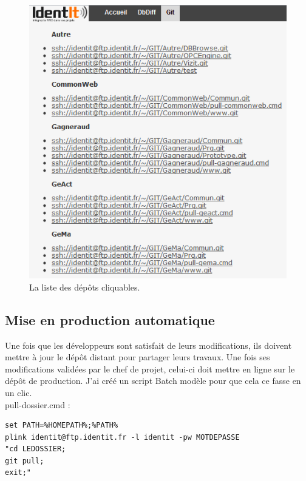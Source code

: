\begin{figure}
\begin{center}
\includegraphics[scale=0.5]{images/repo.png}
\caption{La liste des dépôts cliquables.}
\end{center}
\end{figure}


\subsection{Mise en production automatique} %

Une fois que les développeurs sont satisfait de leurs modifications, ils
doivent mettre à jour le dépôt distant pour partager leurs travaux. Une fois
ses modifications validées par le chef de projet, celui-ci doit mettre en ligne
sur le dépôt de production. J'ai créé un script Batch \og modèle \fg{} pour
que cela ce fasse en un clic.\\
pull-dossier.cmd :
\begin{lstlisting}
set PATH=%HOMEPATH%;%PATH%
plink identit@ftp.identit.fr -l identit -pw MOTDEPASSE
"cd LEDOSSIER;
git pull;
exit;"
\end{lstlisting}


